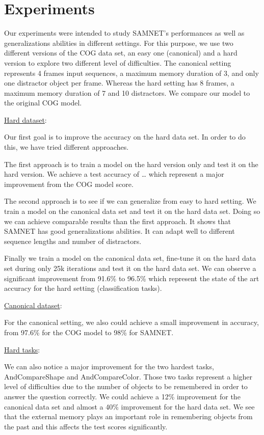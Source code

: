 \section{Experiments}

Our experiments were intended to study SAMNET's performances as well as generalizations abilities in different settings. For this purpose, we use two different versions of the COG data set, an easy one (canonical) and a hard version to explore two different level of difficulties. The canonical setting represents 4 frames input sequences, a maximum memory duration of 3, and only one distractor object per frame. Whereas the hard setting has 8 frames, a maximum memory duration of 7 and 10 distractors. We compare our model to the original COG model.

\underline {Hard dataset}:

Our first goal is to improve the accuracy on the hard data set. In order to do this, we have tried different approaches.

The first approach is to train a model on the hard version only and test it on the hard version. We achieve a test accuracy of … which represent a major improvement from the COG model score.

The second approach is to see if we can generalize from easy to hard setting. We train a model on the canonical data set and test it on the hard data set. Doing so we can achieve comparable results than the first approach. It shows that SAMNET has good generalizations abilities. It can adapt well to different sequence lengths and number of distractors.

Finally we train a model on the canonical data set, fine-tune it on the hard data set during only 25k iterations and test it on the hard data set. We can observe a significant improvement from 91.6\%  to 96.5\%  which represent the state of the art accuracy for the hard setting (classification tasks).


\underline {Canonical dataset}:

For the canonical setting, we also could achieve a small improvement in accuracy, from 97.6\% for the COG model to 98\% for SAMNET.

\underline {Hard tasks}:

We can also notice a major improvement for the two hardest tasks, AndCompareShape and AndCompareColor. Those two tasks represent a higher level of difficulties due to the number of objects to be remembered in order to answer the question correctly.
We could achieve a 12\% improvement for the canonical data set and almost a 40\% improvement for the hard data set.
We see that the external memory plays an important role in remembering objects from the past and this affects the test scores significantly.


